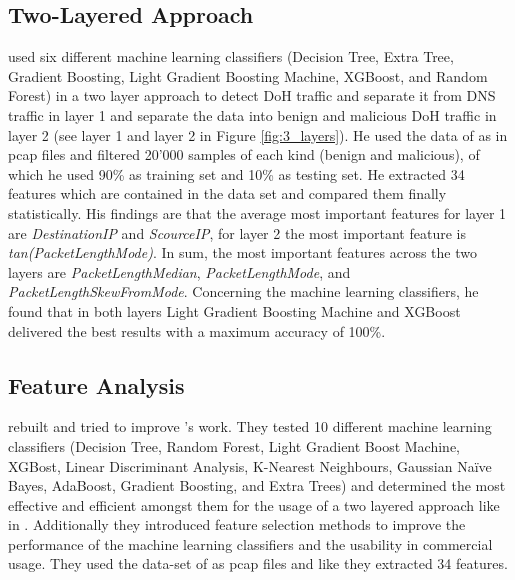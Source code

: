 \subsection{Two-Layered Approach} \label{2layers}
\cite{Banadaki_DetectingMalicousDoHTrafficinDNSUsingML} used six different machine learning classifiers (Decision Tree, Extra Tree, Gradient Boosting, Light Gradient Boosting Machine, XGBoost, and Random Forest) in a two layer approach to detect DoH traffic and separate it from DNS traffic in layer 1 and separate the data into benign and malicious DoH traffic in layer 2 (see layer 1 and layer 2 in Figure \ref{fig:3_layers}). He used the data of \cite{montazerishatoori2020anomaly} as in pcap files and filtered 20’000 samples of each kind (benign and malicious), of which he used 90\% as training set and 10\% as testing set. He extracted 34 features which are contained in the data set and compared them finally statistically. His findings are that the average most important features for layer 1 are \textit{DestinationIP} and \textit{ScourceIP}, for layer 2 the most important feature is \textit{tan(PacketLengthMode)}. In sum, the most important features across the two layers are \textit{PacketLengthMedian}, \textit{PacketLengthMode}, and \textit{PacketLengthSkewFromMode}. Concerning the machine learning classifiers, he found that in both layers Light Gradient Boosting Machine and XGBoost delivered the best results with a maximum accuracy of 100\%.

\subsection{Feature Analysis} \label{feature_analysis}
\cite{BehnkeEtAl_FeatureEngineeringMLModelMaliciusDoHTraffic} rebuilt and tried to improve \cite{Banadaki_DetectingMalicousDoHTrafficinDNSUsingML}'s work. They tested 10 different machine learning classifiers (Decision Tree, Random Forest, Light Gradient Boost Machine, XGBost, Linear Discriminant Analysis, K-Nearest Neighbours, Gaussian Naïve Bayes, AdaBoost, Gradient Boosting, and Extra Trees) and determined the most effective and efficient amongst them for the usage of a two layered approach like in \cite{Banadaki_DetectingMalicousDoHTrafficinDNSUsingML}. Additionally they introduced feature selection methods to improve the performance of the machine learning classifiers and the usability in commercial usage. They used the data-set of \cite{montazerishatoori2020anomaly} as pcap files and like \cite{Banadaki_DetectingMalicousDoHTrafficinDNSUsingML} they extracted 34 features. 

